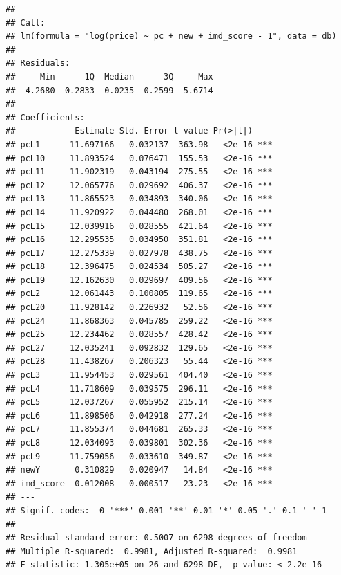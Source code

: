 \documentclass[]{book}
\begin{document}
\begin{verbatim}
## 
## Call:
## lm(formula = "log(price) ~ pc + new + imd_score - 1", data = db)
## 
## Residuals:
##     Min      1Q  Median      3Q     Max 
## -4.2680 -0.2833 -0.0235  0.2599  5.6714 
## 
## Coefficients:
##            Estimate Std. Error t value Pr(>|t|)    
## pcL1      11.697166   0.032137  363.98   <2e-16 ***
## pcL10     11.893524   0.076471  155.53   <2e-16 ***
## pcL11     11.902319   0.043194  275.55   <2e-16 ***
## pcL12     12.065776   0.029692  406.37   <2e-16 ***
## pcL13     11.865523   0.034893  340.06   <2e-16 ***
## pcL14     11.920922   0.044480  268.01   <2e-16 ***
## pcL15     12.039916   0.028555  421.64   <2e-16 ***
## pcL16     12.295535   0.034950  351.81   <2e-16 ***
## pcL17     12.275339   0.027978  438.75   <2e-16 ***
## pcL18     12.396475   0.024534  505.27   <2e-16 ***
## pcL19     12.162630   0.029697  409.56   <2e-16 ***
## pcL2      12.061443   0.100805  119.65   <2e-16 ***
## pcL20     11.928142   0.226932   52.56   <2e-16 ***
## pcL24     11.868363   0.045785  259.22   <2e-16 ***
## pcL25     12.234462   0.028557  428.42   <2e-16 ***
## pcL27     12.035241   0.092832  129.65   <2e-16 ***
## pcL28     11.438267   0.206323   55.44   <2e-16 ***
## pcL3      11.954453   0.029561  404.40   <2e-16 ***
## pcL4      11.718609   0.039575  296.11   <2e-16 ***
## pcL5      12.037267   0.055952  215.14   <2e-16 ***
## pcL6      11.898506   0.042918  277.24   <2e-16 ***
## pcL7      11.855374   0.044681  265.33   <2e-16 ***
## pcL8      12.034093   0.039801  302.36   <2e-16 ***
## pcL9      11.759056   0.033610  349.87   <2e-16 ***
## newY       0.310829   0.020947   14.84   <2e-16 ***
## imd_score -0.012008   0.000517  -23.23   <2e-16 ***
## ---
## Signif. codes:  0 '***' 0.001 '**' 0.01 '*' 0.05 '.' 0.1 ' ' 1
## 
## Residual standard error: 0.5007 on 6298 degrees of freedom
## Multiple R-squared:  0.9981, Adjusted R-squared:  0.9981 
## F-statistic: 1.305e+05 on 26 and 6298 DF,  p-value: < 2.2e-16
\end{verbatim}
\end{document}
